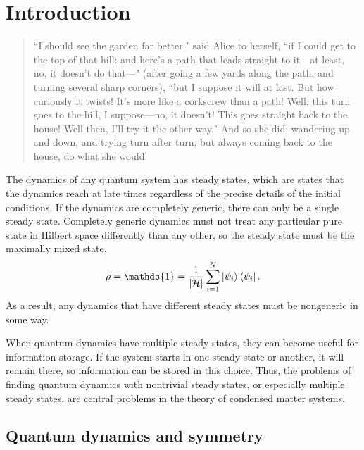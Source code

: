 
\chapter{Introduction}
\label{chp:intro}

\begin{quotation}
	 ``I should see the garden far better," said Alice to herself, ``if I could get to the top of that hill: and here’s a path that leads straight to it—at least, no, it doesn’t do that—" (after going a few yards along the path, and turning several sharp corners), ``but I suppose it will at last. But how curiously it twists! It's more like a corkscrew than a path! Well, this turn goes to the hill, I suppose—no, it doesn't! This goes straight back to the house! Well then, I’ll try it the other way."
	And so she did: wandering up and down, and trying turn after turn, but always coming back to the house, do what she would. 
\end{quotation}

The dynamics of any quantum system has steady states, which are states that the dynamics reach at late times regardless of the precise details of the initial conditions. If the dynamics are completely generic, there can only be a single steady state. Completely generic dynamics must not treat any particular pure state in Hilbert space differently than any other, so the steady state must be the maximally mixed state,
\begin{align}
\rho = \mathds{1} = \frac{1}{|\mathcal{H}|} \sum_{i=1}^N \ket{\psi_i} \bra{\psi_i}.
\end{align}
As a result, any dynamics that have different steady states must be nongeneric in some way. 

When quantum dynamics have multiple steady states, they can become useful for information storage. If the system starts in one steady state or another, it will remain there, so information can be stored in this choice. Thus, the problems of finding quantum dynamics with nontrivial steady states, or especially multiple steady states, are central problems in the theory of condensed matter systems.

\section{Quantum dynamics and symmetry}

